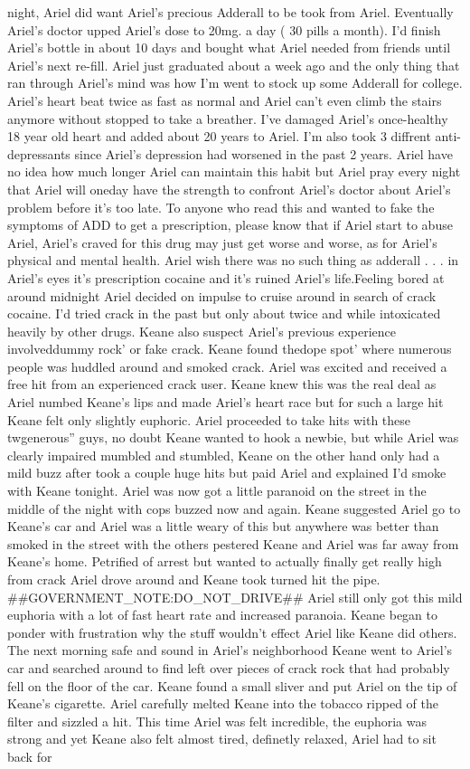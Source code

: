 \documentclass[12pt]{book}
\begin{document}
night, Ariel did want Ariel's precious Adderall to be took from Ariel. Eventually Ariel's doctor upped Ariel's dose to 20mg. a day ( 30 pills a month). I'd finish Ariel's bottle in about 10 days and bought what Ariel needed from friends until Ariel's next re-fill. Ariel just graduated about a week ago and the only thing that ran through Ariel's mind was how I'm went to stock up some Adderall for college. Ariel's heart beat twice as fast as normal and Ariel can't even climb the stairs anymore without stopped to take a breather. I've damaged Ariel's once-healthy 18 year old heart and added about 20 years to Ariel. I'm also took 3 diffrent anti-depressants since Ariel's depression had worsened in the past 2 years. Ariel have no idea how much longer Ariel can maintain this habit but Ariel pray every night that Ariel will oneday have the strength to confront Ariel's doctor about Ariel's problem before it's too late. To anyone who read this and wanted to fake the symptoms of ADD to get a prescription, please know that if Ariel start to abuse Ariel, Ariel's craved for this drug may just get worse and worse, as for Ariel's physical and mental health. Ariel wish there was no such thing as adderall . . .  in Ariel's eyes it's prescription cocaine and it's ruined Ariel's life.Feeling bored at around midnight Ariel decided on impulse to cruise around in search of crack cocaine. I'd tried crack in the past but only about twice and while intoxicated heavily by other drugs. Keane also suspect Ariel's previous experience involveddummy rock' or fake crack. Keane found thedope spot' where numerous people was huddled around and smoked crack. Ariel was excited and received a free hit from an experienced crack user. Keane knew this was the real deal as Ariel numbed Keane's lips and made Ariel's heart race but for such a large hit Keane felt only slightly euphoric. Ariel proceeded to take hits with these twgenerous'' guys, no doubt Keane wanted to hook a newbie, but while Ariel was clearly impaired mumbled and stumbled, Keane on the other hand only had a mild buzz after took a couple huge hits but paid Ariel and explained I'd smoke with Keane tonight. Ariel was now got a little paranoid on the street in the middle of the night with cops buzzed now and again. Keane suggested Ariel go to Keane's car and Ariel was a little weary of this but anywhere was better than smoked in the street with the others pestered Keane and Ariel was far away from Keane's home. Petrified of arrest but wanted to actually finally get really high from crack Ariel drove around and Keane took turned hit the pipe. \#\#GOVERNMENT\_NOTE:DO\_NOT\_DRIVE\#\# Ariel still only got this mild euphoria with a lot of fast heart rate and increased paranoia. Keane began to ponder with frustration why the stuff wouldn't effect Ariel like Keane did others. The next morning safe and sound in Ariel's neighborhood Keane went to Ariel's car and searched around to find left over pieces of crack rock that had probably fell on the floor of the car. Keane found a small sliver and put Ariel on the tip of Keane's cigarette. Ariel carefully melted Keane into the tobacco ripped of the filter and sizzled a hit. This time Ariel was felt incredible, the euphoria was strong and yet Keane also felt almost tired, definetly relaxed, Ariel had to sit back for 
\end{document}
